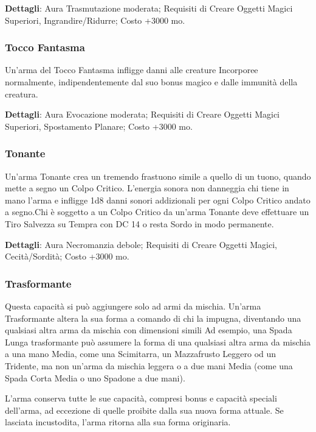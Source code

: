 \begin{multicols}{2}
\textbf{Dettagli}: Aura Trasmutazione moderata; Requisiti di Creare Oggetti Magici Superiori, Ingrandire/Ridurre; Costo +3000 mo.

\subsubsection*{Tocco Fantasma}

Un'arma del Tocco Fantasma infligge danni alle creature Incorporee normalmente, indipendentemente dal suo bonus magico e dalle immunità della creatura.

\textbf{Dettagli}: Aura Evocazione moderata; Requisiti di Creare Oggetti Magici Superiori, Spostamento Planare; Costo +3000 mo.

\subsubsection*{Tonante}

Un'arma Tonante crea un tremendo frastuono simile a quello di un tuono, quando mette a segno un Colpo Critico. L'energia sonora non danneggia chi tiene in mano l'arma e infligge 1d8 danni sonori addizionali per ogni Colpo Critico andato a segno.Chi è soggetto a un Colpo Critico da un'arma Tonante deve effettuare un Tiro Salvezza su Tempra con DC 14 o resta Sordo in modo permanente.

\textbf{Dettagli}: Aura Necromanzia debole; Requisiti di Creare Oggetti Magici, Cecità/Sordità; Costo +3000 mo.

\subsubsection*{Trasformante}

Questa capacità si può aggiungere solo ad armi da mischia. Un'arma Trasformante altera la sua forma a comando di chi la impugna, diventando una qualsiasi altra arma da mischia con dimensioni simili Ad esempio, una Spada Lunga trasformante può assumere la forma di una qualsiasi altra arma da mischia a una mano Media, come una Scimitarra, un Mazzafrusto Leggero od un Tridente, ma non un'arma da mischia leggera o a due mani Media (come una Spada Corta Media o uno Spadone a due mani).

L'arma conserva tutte le sue capacità, compresi bonus e capacità speciali dell'arma, ad eccezione di quelle proibite dalla sua nuova forma attuale. Se lasciata incustodita, l'arma ritorna alla sua forma originaria.


\end{multicols}
